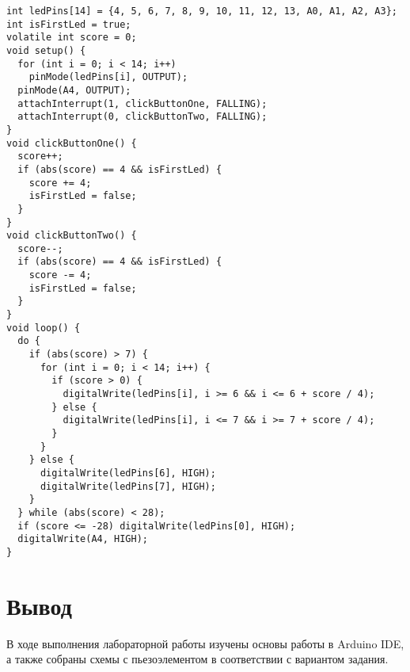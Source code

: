\documentclass[a4paper,14pt]{extarticle}
\begin{document}
  \begingroup
  \fontsize{14pt}{10pt}\selectfont
  \linespread{1}
  \begin{verbatim}
int ledPins[14] = {4, 5, 6, 7, 8, 9, 10, 11, 12, 13, A0, A1, A2, A3};
int isFirstLed = true;
volatile int score = 0;
void setup() {
  for (int i = 0; i < 14; i++)
  	pinMode(ledPins[i], OUTPUT);
  pinMode(A4, OUTPUT);
  attachInterrupt(1, clickButtonOne, FALLING);
  attachInterrupt(0, clickButtonTwo, FALLING);
}
void clickButtonOne() {
  score++;
  if (abs(score) == 4 && isFirstLed) {
    score += 4;
    isFirstLed = false;
  }
}
void clickButtonTwo() {
  score--;
  if (abs(score) == 4 && isFirstLed) {
    score -= 4;
    isFirstLed = false;
  }
}
void loop() {
  do {
    if (abs(score) > 7) {
      for (int i = 0; i < 14; i++) {
        if (score > 0) {
          digitalWrite(ledPins[i], i >= 6 && i <= 6 + score / 4);
        } else {
          digitalWrite(ledPins[i], i <= 7 && i >= 7 + score / 4);
        }
      }
    } else {
      digitalWrite(ledPins[6], HIGH);
      digitalWrite(ledPins[7], HIGH);
    }
  } while (abs(score) < 28);
  if (score <= -28) digitalWrite(ledPins[0], HIGH);
  digitalWrite(A4, HIGH);
}
  \end{verbatim}
  \endgroup

  \section*{\hspace{12.5mm}Вывод}
  В ходе выполнения лабораторной работы изучены основы работы в Arduino IDE, а также собраны схемы с пьезоэлементом в соответствии с вариантом задания.
\end{document}
